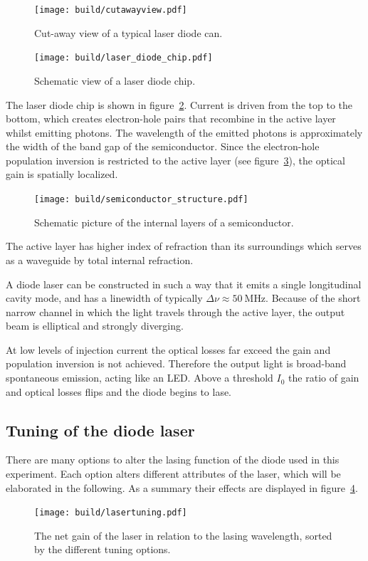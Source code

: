 \begin{figure}[ht]
  \centering
  \texttt{[image: build/cutawayview.pdf]}
  \caption{Cut-away view of a typical laser diode can\cite{anleitung}.}%
  \label{fig:cutawayview}
\end{figure}

\begin{figure}[ht]
  \centering
  \texttt{[image: build/laser\_diode\_chip.pdf]}
  \caption{Schematic view of a laser diode chip\cite{anleitung}.}%
  \label{fig:laser_diode_chip}
\end{figure}

The laser diode chip is shown in figure~\ref{fig:laser_diode_chip}.
Current is driven from the top to the bottom, which creates electron-hole pairs that
recombine in the active layer whilst emitting photons.
The wavelength of the emitted photons is approximately the width of the band gap of the semiconductor.
Since the electron-hole population inversion is restricted to the active layer (see
figure~\ref{fig:semiconductor_structure}),
the optical gain is spatially localized.

\begin{figure}[ht]
  \centering
  \texttt{[image: build/semiconductor\_structure.pdf]}
  \caption{Schematic picture of the internal layers of a semiconductor\cite{anleitung}.}%
  \label{fig:semiconductor_structure}
\end{figure}

The active layer has higher index of refraction than its surroundings
which serves as a waveguide by total internal refraction.

A diode laser can be constructed in such a way that it emits a single longitudinal cavity mode,
and has a linewidth of typically $\Delta \nu \approx \SI{50}{\mega\hertz}$.
Because of the short narrow channel in which the light travels through the active layer,
the output beam is elliptical and strongly diverging.

At low levels of injection current the optical losses far exceed the gain and population inversion
is not achieved.
Therefore the output light is broad-band spontaneous emission, acting like an LED.
Above a threshold $I_0$ the ratio of gain and optical losses flips and the diode begins to lase.

\subsection{Tuning of the diode laser}\label{tuning-of-the-diode-laser}
There are many options to alter the lasing function of the diode used in this experiment.
Each option alters different attributes of the laser, which will be elaborated in the following.
As a summary their effects are displayed in figure~\ref{fig:lasertuning}.
\begin{figure}[ht]
  \centering
  \texttt{[image: build/lasertuning.pdf]}
  \caption{The net gain of the laser in relation to the lasing wavelength, sorted by the different
  tuning options\cite{anleitung}.}%
  \label{fig:lasertuning}
\end{figure}

